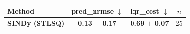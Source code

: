 \begin{tabular}{lccc}
\toprule
Method & pred\_nrmse $\downarrow$ & lqr\_cost $\downarrow$ & $n$ \\
\midrule
\textbf{SINDy (STLSQ)} & \textbf{0.13 $\pm$ 0.17} & \textbf{0.69 $\pm$ 0.07} & 25 \\
\bottomrule
\end{tabular}

